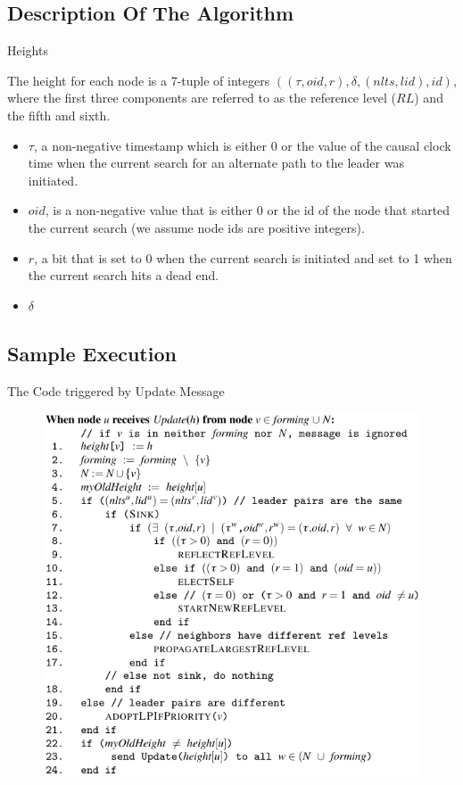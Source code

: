 \documentclass{beamer}
\begin{document}
\subsection{Description Of The Algorithm}
\begin{frame}{Heights}

The height for each node is a 7-tuple of integers $((\tau , oid, r), \delta, (nlts, lid), id)$, where the first three components are referred to as the reference level ($RL$) and the fifth and sixth.

\begin{itemize}
	\item $\tau$, a non-negative timestamp which is either 0 or the value of the causal clock time when the current search for an alternate path to the leader was initiated.
	\item $oid$, is a non-negative value that is either 0 or the id of the node that started the current search (we assume node ids are positive integers).
	\item $r$, a bit that is set to 0 when the current search is initiated and set to 1 when the current search hits a dead end.
	\item $\delta$

\end{itemize}

\end{frame}


\subsection{Sample Execution}

\begin{frame}{The Code triggered by Update Message}
\begin{figure}[h]
	\centering
	\includegraphics[width=0.6\linewidth]{tcode_update.png}
	\label{fig:figure1}
\end{figure}
\end{frame}
\end{document}
